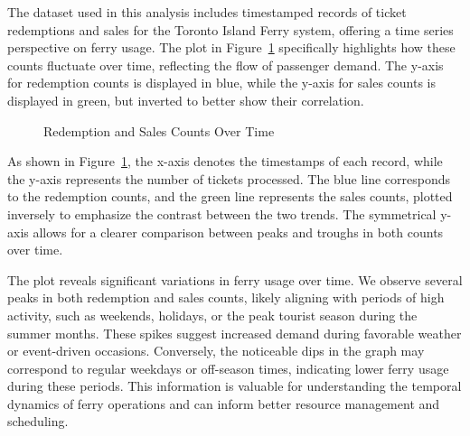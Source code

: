 \documentclass[
  letterpaper,
  DIV=11,
  numbers=noendperiod]{scrartcl}
\begin{document}
The dataset used in this analysis includes timestamped records of ticket
redemptions and sales for the Toronto Island Ferry system, offering a
time series perspective on ferry usage. The plot in
Figure~\ref{fig-linePlot} specifically highlights how these counts
fluctuate over time, reflecting the flow of passenger demand. The y-axis
for redemption counts is displayed in blue, while the y-axis for sales
counts is displayed in green, but inverted to better show their
correlation.

\begin{figure}


\caption{\label{fig-linePlot}Redemption and Sales Counts Over Time}

\end{figure}%

As shown in Figure~\ref{fig-linePlot}, the x-axis denotes the timestamps
of each record, while the y-axis represents the number of tickets
processed. The blue line corresponds to the redemption counts, and the
green line represents the sales counts, plotted inversely to emphasize
the contrast between the two trends. The symmetrical y-axis allows for a
clearer comparison between peaks and troughs in both counts over time.

The plot reveals significant variations in ferry usage over time. We
observe several peaks in both redemption and sales counts, likely
aligning with periods of high activity, such as weekends, holidays, or
the peak tourist season during the summer months. These spikes suggest
increased demand during favorable weather or event-driven occasions.
Conversely, the noticeable dips in the graph may correspond to regular
weekdays or off-season times, indicating lower ferry usage during these
periods. This information is valuable for understanding the temporal
dynamics of ferry operations and can inform better resource management
and scheduling.
\end{document}
